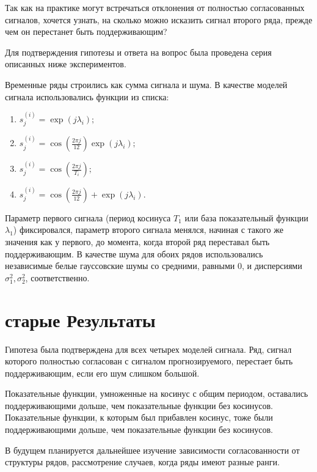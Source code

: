 \documentclass[specialist, substylefile = spbureport.rtx,
    subf,href,colorlinks=true, 12pt]{disser}
\begin{document}
        Так как на практике могут встречаться отклонения от полностью согласованных сигналов, хочется узнать, на сколько можно исказить сигнал второго ряда, прежде чем он перестанет быть поддерживающим?

        Для подтверждения гипотезы и ответа на вопрос была проведена серия описанных ниже экспериментов.

        Временные ряды строились как сумма сигнала и шума.
        В качестве моделей сигнала использовались функции из списка:
            \begin{enumerate}
                \item $s^{(i)}_j = \exp(j\lambda_i);$
                \item $s^{(i)}_j = \cos(\frac{2\pi j}{12})\exp(j\lambda_i);$
                \item $s^{(i)}_j = \cos(\frac{2\pi j}{T_i});$
                \item $s^{(i)}_j = \cos(\frac{2\pi j}{12}) + \exp(j\lambda_i).$
            \end{enumerate}
        Параметр первого сигнала (период косинуса $T_1$ или база показательный функции $\lambda_1$) фиксировался, параметр второго сигнала менялся, начиная с такого же значения как у первого, до момента, когда второй ряд переставал быть поддерживающим.
        В качестве шума для обоих рядов использовались независимые белые гауссовские шумы со средними, равными 0, и дисперсиями $\sigma_1^2, \sigma_2^2$, соответственно.



    \section{старые Результаты}
        
        Гипотеза была подтверждена для всех четырех моделей сигнала. Ряд, сигнал которого полностью согласован с сигналом прогнозируемого, перестает быть поддерживающим, если его шум слишком большой.

        Показательные функции, умноженные на косинус с общим периодом, оставались поддерживающими дольше, чем показательные функции без косинусов.
        Показательные функции, к которым был прибавлен косинус, тоже были поддерживающими дольше, чем показательные функции без косинусов.
        


    \conclusion
        В будущем планируется дальнейшее изучение зависимости согласованности от структуры рядов, рассмотрение случаев, когда ряды имеют разные ранги. 
\end{document}
